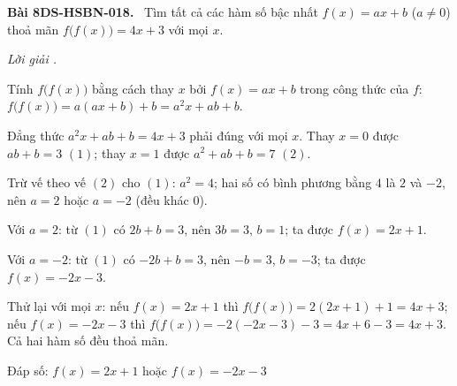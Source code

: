 \documentclass[12pt,a4paper]{article}
\newenvironment{problem}[1][]{\par\medskip\noindent\textbf{Bài #1.}\ }{\par}
\newenvironment{solution}[1][]{\par\noindent\textit{Lời giải #1.}\par}{\par}
\begin{document}
\begin{problem}[8DS-HSBN-018]
Tìm tất cả các hàm số bậc nhất $f(x) = ax + b$ ($a \neq 0$) thoả mãn $f\big(f(x)\big) = 4x + 3$ với mọi $x$.

\begin{solution}
Tính $f\big(f(x)\big)$ bằng cách thay $x$ bởi $f(x) = ax + b$ trong công thức của $f$: $f\big(f(x)\big) = a(ax + b) + b = a^2x + ab + b$.

Đẳng thức $a^2x + ab + b = 4x + 3$ phải đúng với mọi $x$. Thay $x = 0$ được $ab + b = 3$ $(1)$; thay $x = 1$ được $a^2 + ab + b = 7$ $(2)$.

Trừ vế theo vế $(2)$ cho $(1)$: $a^2 = 4$; hai số có bình phương bằng $4$ là $2$ và $-2$, nên $a = 2$ hoặc $a = -2$ (đều khác $0$).

Với $a = 2$: từ $(1)$ có $2b + b = 3$, nên $3b = 3$, $b = 1$; ta được $f(x) = 2x + 1$.

Với $a = -2$: từ $(1)$ có $-2b + b = 3$, nên $-b = 3$, $b = -3$; ta được $f(x) = -2x - 3$.

Thử lại với mọi $x$: nếu $f(x) = 2x + 1$ thì $f\big(f(x)\big) = 2(2x + 1) + 1 = 4x + 3$; nếu $f(x) = -2x - 3$ thì $f\big(f(x)\big) = -2(-2x - 3) - 3 = 4x + 6 - 3 = 4x + 3$. Cả hai hàm số đều thoả mãn.

Đáp số: $\boxed{f(x) = 2x + 1 \text{ hoặc } f(x) = -2x - 3}$
\end{solution}
\end{problem}
\end{document}
